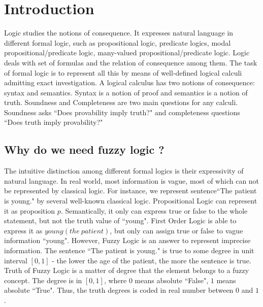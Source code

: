 \documentclass[Thesis.tex]{subfiles}
\begin{document}
\section{Introduction}
\label{chap:Introduction}
Logic studies the notions of consequence. It expresses natural language in different formal logic, such as propositional logic, predicate logics, modal propositional/predicate logic, many-valued propositional/predicate logic. Logic deals with set of formulas and the relation of consequence among them. The task of formal logic is to represent all this by means of well-defined logical calculi admitting exact investigation. A logical calculus has two notions of consequence: syntax and semantics. Syntax is a notion of proof and semantics is a notion of truth. Soundness and Completeness are two main questions for any calculi. Soundness asks ``Does provability imply truth?" and completeness questions ``Does truth imply provability?"

\subsection{Why do we need fuzzy logic ?}
The intuitive distinction among different formal logics is their expressivity of natural language. In real world, most information is vague, most of which can not be represented by classical logic. For instance, we represent sentence``The patient is young." by several well-known classical logic. Propositional Logic can represent it as proposition $p$. Semantically, it only can express true or false to the whole statement, but not the truth value of ``young". First Order Logic is able to express it as $young(the\ patient)$, but only can assign true or false to vague information ``young". However, Fuzzy Logic is an answer to represent imprecise information. The sentence ``The patient is young." is true to some degree in unit interval $[0,1]$ - the lower the age of the patient, the more the sentence is true. Truth of Fuzzy Logic is a matter of degree that the element belongs to a fuzzy concept. The degree is in $[0,1]$, where $0$ means absolute ``False", $1$ means absolute ``True". Thus, the truth degrees is coded in real number between $0$ and $1$.

\end{document}
